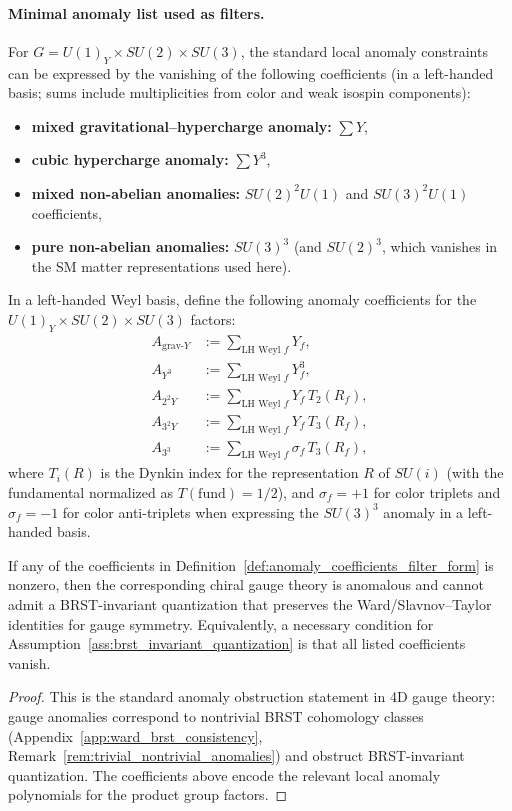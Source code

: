 \paragraph{Minimal anomaly list used as filters.}
For $G=U(1)_Y\times SU(2)\times SU(3)$, the standard local anomaly constraints can be expressed by the vanishing of the following coefficients (in a left-handed basis; sums include multiplicities from color and weak isospin components):
\begin{itemize}
\item \textbf{mixed gravitational--hypercharge anomaly:} $\sum Y$,
\item \textbf{cubic hypercharge anomaly:} $\sum Y^3$,
\item \textbf{mixed non-abelian anomalies:} $SU(2)^2U(1)$ and $SU(3)^2U(1)$ coefficients,
\item \textbf{pure non-abelian anomalies:} $SU(3)^3$ (and $SU(2)^3$, which vanishes in the SM matter representations used here).
\end{itemize}

\begin{definition}\label{def:anomaly_coefficients_filter_form}
\MathTag In a left-handed Weyl basis, define the following anomaly coefficients for the $U(1)_Y\times SU(2)\times SU(3)$ factors:
\begin{align*}
A_{\mathrm{grav}\text{-}Y} &:= \sum_{\text{LH Weyl }f} Y_f,\\
A_{Y^3} &:= \sum_{\text{LH Weyl }f} Y_f^3,\\
A_{2^2Y} &:= \sum_{\text{LH Weyl }f} Y_f\,T_2(R_f),\\
A_{3^2Y} &:= \sum_{\text{LH Weyl }f} Y_f\,T_3(R_f),\\
A_{3^3} &:= \sum_{\text{LH Weyl }f} \sigma_f\,T_3(R_f),
\end{align*}
where $T_i(R)$ is the Dynkin index for the representation $R$ of $SU(i)$ (with the fundamental normalized as $T(\text{fund})=1/2$), and $\sigma_f=+1$ for color triplets and $\sigma_f=-1$ for color anti-triplets when expressing the $SU(3)^3$ anomaly in a left-handed basis.
\end{definition}

\begin{proposition}\label{prop:local_anomaly_filter}
\MathTag If any of the coefficients in Definition~\ref{def:anomaly_coefficients_filter_form} is nonzero, then the corresponding chiral gauge theory is anomalous and cannot admit a BRST-invariant quantization that preserves the Ward/Slavnov--Taylor identities for gauge symmetry.
Equivalently, a necessary condition for Assumption~\ref{ass:brst_invariant_quantization} is that all listed coefficients vanish.
\end{proposition}
\begin{proof}
This is the standard anomaly obstruction statement in 4D gauge theory:
gauge anomalies correspond to nontrivial BRST cohomology classes (Appendix~\ref{app:ward_brst_consistency}, Remark~\ref{rem:trivial_nontrivial_anomalies}) and obstruct BRST-invariant quantization.
The coefficients above encode the relevant local anomaly polynomials for the product group factors.
\end{proof}

